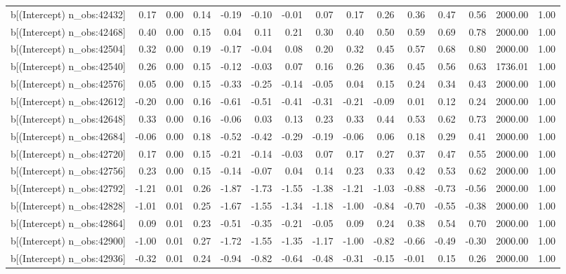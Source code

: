 \begin{table}[ht]
\begin{tabular}{rrrrrrrrrrrrrrr}
  b[(Intercept) n\_obs:42432] & 0.17 & 0.00 & 0.14 & -0.19 & -0.10 & -0.01 & 0.07 & 0.17 & 0.26 & 0.36 & 0.47 & 0.56 & 2000.00 & 1.00 \\ 
  b[(Intercept) n\_obs:42468] & 0.40 & 0.00 & 0.15 & 0.04 & 0.11 & 0.21 & 0.30 & 0.40 & 0.50 & 0.59 & 0.69 & 0.78 & 2000.00 & 1.00 \\ 
  b[(Intercept) n\_obs:42504] & 0.32 & 0.00 & 0.19 & -0.17 & -0.04 & 0.08 & 0.20 & 0.32 & 0.45 & 0.57 & 0.68 & 0.80 & 2000.00 & 1.00 \\ 
  b[(Intercept) n\_obs:42540] & 0.26 & 0.00 & 0.15 & -0.12 & -0.03 & 0.07 & 0.16 & 0.26 & 0.36 & 0.45 & 0.56 & 0.63 & 1736.01 & 1.00 \\ 
  b[(Intercept) n\_obs:42576] & 0.05 & 0.00 & 0.15 & -0.33 & -0.25 & -0.14 & -0.05 & 0.04 & 0.15 & 0.24 & 0.34 & 0.43 & 2000.00 & 1.00 \\ 
  b[(Intercept) n\_obs:42612] & -0.20 & 0.00 & 0.16 & -0.61 & -0.51 & -0.41 & -0.31 & -0.21 & -0.09 & 0.01 & 0.12 & 0.24 & 2000.00 & 1.00 \\ 
  b[(Intercept) n\_obs:42648] & 0.33 & 0.00 & 0.16 & -0.06 & 0.03 & 0.13 & 0.23 & 0.33 & 0.44 & 0.53 & 0.62 & 0.73 & 2000.00 & 1.00 \\ 
  b[(Intercept) n\_obs:42684] & -0.06 & 0.00 & 0.18 & -0.52 & -0.42 & -0.29 & -0.19 & -0.06 & 0.06 & 0.18 & 0.29 & 0.41 & 2000.00 & 1.00 \\ 
  b[(Intercept) n\_obs:42720] & 0.17 & 0.00 & 0.15 & -0.21 & -0.14 & -0.03 & 0.07 & 0.17 & 0.27 & 0.37 & 0.47 & 0.55 & 2000.00 & 1.00 \\ 
  b[(Intercept) n\_obs:42756] & 0.23 & 0.00 & 0.15 & -0.14 & -0.07 & 0.04 & 0.14 & 0.23 & 0.33 & 0.42 & 0.53 & 0.62 & 2000.00 & 1.00 \\ 
  b[(Intercept) n\_obs:42792] & -1.21 & 0.01 & 0.26 & -1.87 & -1.73 & -1.55 & -1.38 & -1.21 & -1.03 & -0.88 & -0.73 & -0.56 & 2000.00 & 1.00 \\ 
  b[(Intercept) n\_obs:42828] & -1.01 & 0.01 & 0.25 & -1.67 & -1.55 & -1.34 & -1.18 & -1.00 & -0.84 & -0.70 & -0.55 & -0.38 & 2000.00 & 1.00 \\ 
  b[(Intercept) n\_obs:42864] & 0.09 & 0.01 & 0.23 & -0.51 & -0.35 & -0.21 & -0.05 & 0.09 & 0.24 & 0.38 & 0.54 & 0.70 & 2000.00 & 1.00 \\ 
  b[(Intercept) n\_obs:42900] & -1.00 & 0.01 & 0.27 & -1.72 & -1.55 & -1.35 & -1.17 & -1.00 & -0.82 & -0.66 & -0.49 & -0.30 & 2000.00 & 1.00 \\ 
  b[(Intercept) n\_obs:42936] & -0.32 & 0.01 & 0.24 & -0.94 & -0.82 & -0.64 & -0.48 & -0.31 & -0.15 & -0.01 & 0.15 & 0.26 & 2000.00 & 1.00 \\ 

\end{tabular}
\end{table}

